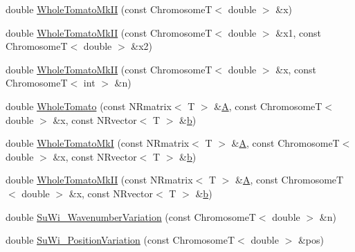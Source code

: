 \begin{DoxyCompactItemize}
double \hyperlink{struct_p_r_p_s_evolution_1_1_solve_1_1_ueber9000_a31beed300339da3c995c8b2f2ad0bfed}{\-Whole\-Tomato\-Mk\-I\-I} (const \-Chromosome\-T$<$ double $>$ \&x)
\item 
double \hyperlink{struct_p_r_p_s_evolution_1_1_solve_1_1_ueber9000_af2fa5a88c143ccb73828a4ff2ca733f9}{\-Whole\-Tomato\-Mk\-I\-I} (const \-Chromosome\-T$<$ double $>$ \&x1, const \-Chromosome\-T$<$ double $>$ \&x2)
\item 
double \hyperlink{struct_p_r_p_s_evolution_1_1_solve_1_1_ueber9000_a58ae6d9699759b02099c1fea85129b2e}{\-Whole\-Tomato\-Mk\-I\-I} (const \-Chromosome\-T$<$ double $>$ \&x, const \-Chromosome\-T$<$ int $>$ \&n)
\item 
double \hyperlink{struct_p_r_p_s_evolution_1_1_solve_1_1_ueber9000_ae0fc34d15ede45e5e2aba14a4dea286e}{\-Whole\-Tomato} (const \-N\-Rmatrix$<$ \-T $>$ \&\hyperlink{struct_p_r_p_s_evolution_1_1_solve_1_1_ueber9000_a269888fd0617f5d4149957210b6a7ccc}{\-A}, const \-Chromosome\-T$<$ double $>$ \&x, const \-N\-Rvector$<$ \-T $>$ \&\hyperlink{struct_p_r_p_s_evolution_1_1_solve_1_1_ueber9000_aef9c195d69ce0feec1f005062eaa7f79}{b})
\item 
double \hyperlink{struct_p_r_p_s_evolution_1_1_solve_1_1_ueber9000_ad148d570d0793171084223e46a01a9c5}{\-Whole\-Tomato\-Mk\-I} (const \-N\-Rmatrix$<$ \-T $>$ \&\hyperlink{struct_p_r_p_s_evolution_1_1_solve_1_1_ueber9000_a269888fd0617f5d4149957210b6a7ccc}{\-A}, const \-Chromosome\-T$<$ double $>$ \&x, const \-N\-Rvector$<$ \-T $>$ \&\hyperlink{struct_p_r_p_s_evolution_1_1_solve_1_1_ueber9000_aef9c195d69ce0feec1f005062eaa7f79}{b})
\item 
double \hyperlink{struct_p_r_p_s_evolution_1_1_solve_1_1_ueber9000_aa5020ca38f0b7477c2cad560cb2f7b75}{\-Whole\-Tomato\-Mk\-I\-I} (const \-N\-Rmatrix$<$ \-T $>$ \&\hyperlink{struct_p_r_p_s_evolution_1_1_solve_1_1_ueber9000_a269888fd0617f5d4149957210b6a7ccc}{\-A}, const \-Chromosome\-T$<$ double $>$ \&x, const \-N\-Rvector$<$ \-T $>$ \&\hyperlink{struct_p_r_p_s_evolution_1_1_solve_1_1_ueber9000_aef9c195d69ce0feec1f005062eaa7f79}{b})
\item 
double \hyperlink{struct_p_r_p_s_evolution_1_1_solve_1_1_ueber9000_a309de628a2daf9806541d985d63d10e0}{\-Su\-Wi\-\_\-\-Wavenumber\-Variation} (const \-Chromosome\-T$<$ double $>$ \&n)
\item 
double \hyperlink{struct_p_r_p_s_evolution_1_1_solve_1_1_ueber9000_acf6a023c6bb391a906f1ea08816d133d}{\-Su\-Wi\-\_\-\-Position\-Variation} (const \-Chromosome\-T$<$ double $>$ \&pos)
\item 

\end{DoxyCompactItemize}
